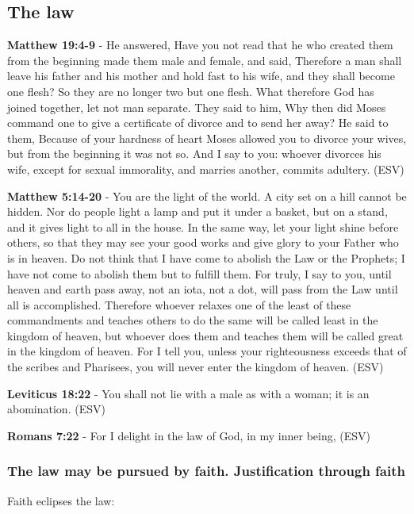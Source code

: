 \documentclass[11pt]{article}
\begin{document}
\subsection{The law}
\label{sec:orgd67610c}

\textbf{Matthew 19:4-9} - He answered, Have you not read that he who created them from the beginning made them male and female, and said, Therefore a man shall leave his father and his mother and hold fast to his wife, and they shall become one flesh? So they are no longer two but one flesh. What therefore God has joined together, let not man separate. They said to him, Why then did Moses command one to give a certificate of divorce and to send her away? He said to them, Because of your hardness of heart Moses allowed you to divorce your wives, but from the beginning it was not so. And I say to you: whoever divorces his wife, except for sexual immorality, and marries another, commits adultery. (ESV)

\textbf{Matthew 5:14-20} - You are the light of the world. A city set on a hill cannot be hidden. Nor do people light a lamp and put it under a basket, but on a stand, and it gives light to all in the house. In the same way, let your light shine before others, so that they may see your good works and give glory to your Father who is in heaven. Do not think that I have come to abolish the Law or the Prophets; I have not come to abolish them but to fulfill them. For truly, I say to you, until heaven and earth pass away, not an iota, not a dot, will pass from the Law until all is accomplished. Therefore whoever relaxes one of the least of these commandments and teaches others to do the same will be called least in the kingdom of heaven, but whoever does them and teaches them will be called great in the kingdom of heaven. For I tell you, unless your righteousness exceeds that of the scribes and Pharisees, you will never enter the kingdom of heaven. (ESV)

\textbf{Leviticus 18:22} - You shall not lie with a male as with a woman; it is an abomination. (ESV)

\textbf{Romans 7:22} - For I delight in the law of God, in my inner being, (ESV)

\subsubsection{The law may be pursued by faith. Justification through faith}
\label{sec:org55768ab}

Faith eclipses the law:
\end{document}
